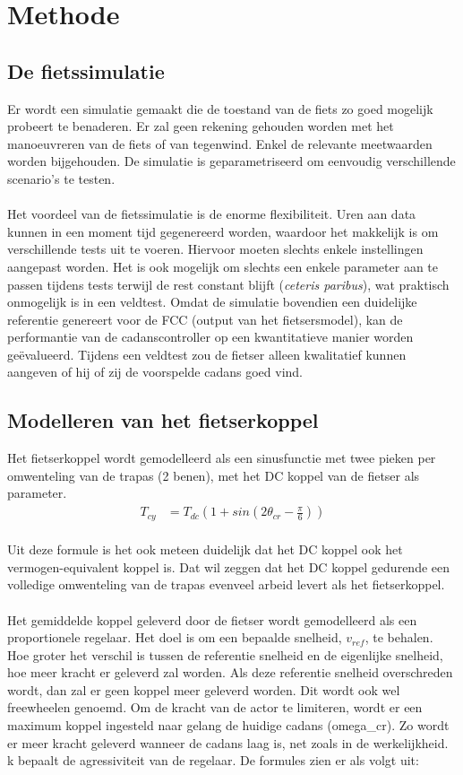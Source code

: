 \chapter{Methode}
\section{De fietssimulatie}
Er wordt een simulatie gemaakt die de toestand van de fiets zo goed mogelijk probeert te benaderen. Er zal geen rekening gehouden worden met het manoeuvreren van de fiets of van tegenwind. Enkel de relevante meetwaarden worden bijgehouden. De simulatie is geparametriseerd om eenvoudig verschillende scenario’s te testen.
\\\\
Het voordeel van de fietssimulatie is de enorme flexibiliteit. Uren aan data kunnen in een moment tijd gegenereerd worden, waardoor het makkelijk is om verschillende tests uit te voeren. Hiervoor moeten slechts enkele instellingen aangepast worden. Het is ook mogelijk om slechts een enkele parameter aan te passen tijdens tests terwijl de rest constant blijft (\textit{ceteris paribus}), wat praktisch onmogelijk is in een veldtest. Omdat de simulatie bovendien een duidelijke referentie genereert voor de FCC (output van het fietsersmodel), kan de performantie van de cadanscontroller op een kwantitatieve manier worden geëvalueerd. Tijdens een veldtest zou de fietser alleen kwalitatief kunnen aangeven of hij of zij de voorspelde cadans goed vind. 
\section{Modelleren van het fietserkoppel}
Het fietserkoppel wordt gemodelleerd als een sinusfunctie met twee pieken per omwenteling van de trapas (2 benen), met het DC koppel van de fietser als parameter.
\\
\begin{align*}
 T_{cy} &= T_{dc}(1+sin(2\theta_{cr}-\frac{\pi}{6}))
\end{align*}
\\
Uit deze formule is het ook meteen duidelijk dat het DC koppel ook het vermogen-equivalent koppel is. Dat wil zeggen dat het DC koppel gedurende een volledige omwenteling van de trapas evenveel arbeid levert als het fietserkoppel.
\\\\
Het gemiddelde koppel geleverd door de fietser wordt gemodelleerd als een proportionele regelaar. Het doel is om een bepaalde snelheid, $v_{ref}$, te behalen. Hoe groter het verschil is tussen de referentie snelheid en de eigenlijke snelheid, hoe meer kracht er geleverd zal worden. Als deze referentie snelheid overschreden wordt, dan zal er geen koppel meer geleverd worden. Dit wordt ook wel freewheelen genoemd. Om de kracht van de actor te limiteren, wordt er een maximum koppel ingesteld naar gelang de huidige cadans (\gls{omega_cr}). Zo wordt er meer kracht geleverd wanneer de cadans laag is, net zoals in de werkelijkheid. \gls{k} bepaalt de agressiviteit van de regelaar. De formules zien er als volgt uit:

